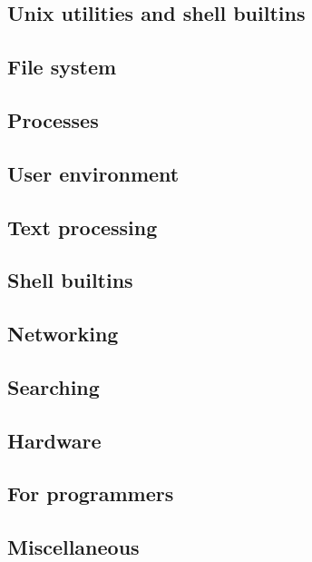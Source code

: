 \documentclass[a4paper, twoside, 8pt]{extarticle}
\begin{document}
\begin{multicols*}{3}
\section{Unix utilities and shell builtins}

\subsection{File system}


\subsection{Processes}


\subsection{User environment}


\subsection{Text processing}


\subsection{Shell builtins}


\subsection{Networking}


\subsection{Searching}


\subsection{Hardware}


\subsection{For programmers}


\subsection{Miscellaneous}

\end{multicols*}
\end{document}
